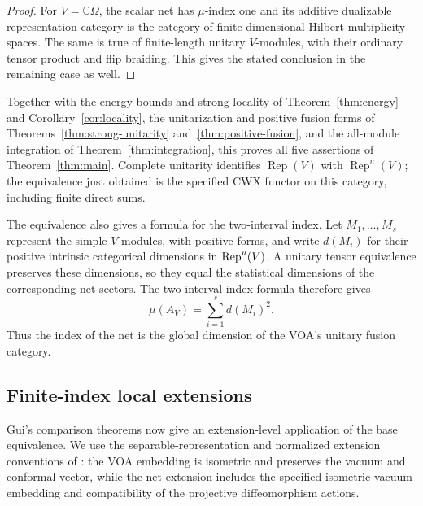 \begin{proof}
For \(V=\mathbb C\Omega\), the scalar net has \(\mu\)-index one and
its additive dualizable representation category is the category of
finite-dimensional Hilbert multiplicity spaces.  The same is true of
finite-length unitary \(V\)-modules, with their ordinary tensor product
and flip braiding.  This gives the stated conclusion in the remaining
case as well.
\end{proof}

Together with the energy bounds and strong locality of
Theorem~\ref{thm:energy} and Corollary~\ref{cor:locality}, the
unitarization and positive fusion forms of
Theorems~\ref{thm:strong-unitarity} and~\ref{thm:positive-fusion}, and
the all-module integration of Theorem~\ref{thm:integration}, this proves
all five assertions of Theorem~\ref{thm:main}.  Complete unitarity
identifies \(\operatorname{Rep}(V)\) with
\(\operatorname{Rep}^{u}(V)\); the equivalence just obtained is the
specified CWX functor on this category, including finite direct sums.

The equivalence also gives a formula for the two-interval index.
Let $M_1,\ldots,M_s$ represent the simple $V$-modules, with positive
forms, and write $d(M_i)$ for their positive intrinsic categorical
dimensions in $\operatorname{Rep}^u(V)$. A unitary tensor equivalence preserves these
dimensions, so they equal the statistical dimensions of the corresponding
net sectors. The two-interval index formula
\cite[Theorem~33]{KLM} therefore gives
\[
 \mu(A_V)=\sum_{i=1}^s d(M_i)^2.
\]
Thus the index of the net is the global dimension of the VOA's unitary
fusion category.

\subsection{Finite-index local extensions}
\label{sec:extensions}

Gui's comparison theorems now give an extension-level application of the
base equivalence. We use the separable-representation and normalized
extension conventions of
\cite[Definitions~3.9 and~5.1]{GuiExtensions}: the VOA embedding is
isometric and preserves the vacuum and conformal vector, while the net
extension includes the specified isometric vacuum embedding and
compatibility of the projective diffeomorphism actions.

